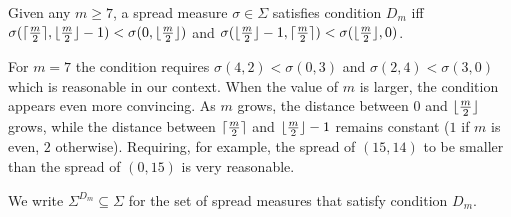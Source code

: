 \documentclass[version=3.21, pagesize, twoside=off, bibliography=totoc, DIV=calc, fontsize=12pt, a4paper]{scrartcl}
\begin{document}
\begin{definition}
    Given any $m \geq 7$, a spread measure $\sigma \in \Sigma$ satisfies condition $D_m$ iff 
    $\sigma(\lceil\frac{m}{2}\rceil, \lfloor\frac{m}{2}\rfloor - 1) < \sigma(0, \lfloor\frac{m}{2}\rfloor)$ and 
    $\sigma(\lfloor\frac{m}{2}\rfloor - 1, \lceil\frac{m}{2}\rceil) < \sigma(\lfloor\frac{m}{2}\rfloor, 0)$.
\end{definition}
For $m=7$ the condition requires $\sigma(4,2) < \sigma(0,3)$ and $\sigma(2,4) < \sigma(3,0)$ which is reasonable in our context. When the value of $m$ is larger, the condition appears even more convincing. As $m$ grows, the distance between $0$ and $\lfloor\frac{m}{2}\rfloor$ grows, while the distance between $\lceil\frac{m}{2}\rceil$ and $\lfloor\frac{m}{2}\rfloor - 1$ remains constant ($1$ if $m$ is even, $2$ otherwise). Requiring, for example, the spread of $(15,14)$ to be smaller than the spread of $(0,15)$ is very reasonable.

We write $\Sigma^{D_{m}} \subseteq \Sigma$ for the set of spread measures that satisfy condition $D_{m}$. 
\end{document}
